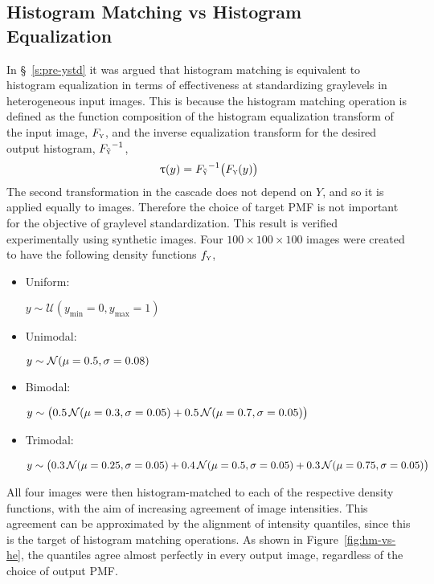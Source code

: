 \subsection{Histogram Matching vs Histogram Equalization}\label{ss:hm-vs-he}
In \S~\ref{s:pre-ystd} it was argued that
histogram matching is equivalent to histogram equalization
in terms of effectiveness at standardizing graylevels in heterogeneous input images.
This is because the histogram matching operation is defined as
the function composition of the histogram equalization transform of the input image, $F_{\textsc{y}}$,
and the inverse equalization transform for the desired output histogram, ${F_{\tilde{\textsc{y}}}}^{-1}$,
\begin{equation}
  \uptau(y) = {F_{\tilde{\textsc{y}}}}^{-1}\big(F_{\textsc{y}}(y)\big)
\end{equation}
The second transformation in the cascade does not depend on $Y$,
and so it is applied equally to images.
Therefore the choice of target PMF is not important for the objective of graylevel standardization.
This result is verified experimentally using synthetic images.
Four $100\times100\times100$ images were created to have the following density functions $f_{\textsc{y}}$,
\begin{itemize}[itemsep=0pt,topsep=0pt]
  \item \parbox{2cm}{Uniform:}
  $y\sim\mathcal{U}(y_{\min}=0,y_{\max}=1)$
  \item \parbox{2cm}{Unimodal:}
  $y\sim\mathcal{N}(\mu=0.5,\sigma=0.08)$
  \item \parbox{2cm}{Bimodal:}
  $y\sim\big(0.5\thinspace\mathcal{N}(\mu=0.3,\sigma=0.05)
            +0.5\thinspace\mathcal{N}(\mu=0.7,\sigma=0.05)\big)$
  \item \parbox{2cm}{Trimodal:}
  $y\sim\big(0.3\thinspace\mathcal{N}(\mu=0.25,\sigma=0.05)
            +0.4\thinspace\mathcal{N}(\mu=0.5,\sigma=0.05)
            +0.3\thinspace\mathcal{N}(\mu=0.75,\sigma=0.05)\big)$
\end{itemize}
All four images were then histogram-matched to each of the respective density functions,
with the aim of increasing agreement of image intensities.
This agreement can be approximated by the alignment of intensity quantiles,
since this is the target of histogram matching operations.
As shown in Figure~\ref{fig:hm-vs-he}, the quantiles agree almost perfectly in every output image,
regardless of the choice of output PMF.
